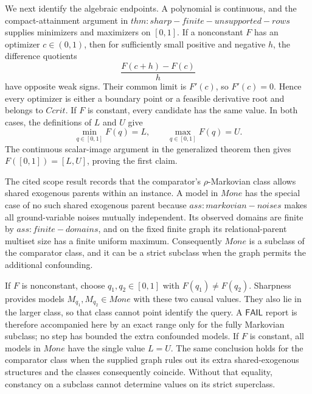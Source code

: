 We next identify the algebraic endpoints.  A polynomial is continuous, and the compact-attainment argument in \(thm:sharp-finite-unsupported-rows\) supplies minimizers and maximizers on \([0,1]\).  If a nonconstant \(F\) has an optimizer \(c\in(0,1)\), then for sufficiently small positive and negative \(h\), the difference quotients
\[
 \frac{F(c+h)-F(c)}{h}
\]
have opposite weak signs.  Their common limit is \(F'(c)\), so \(F'(c)=0\).  Hence every optimizer is either a boundary point or a feasible derivative root and belongs to \(Ccrit\).  If \(F\) is constant, every candidate has the same value.  In both cases, the definitions of \(L\) and \(U\) give
\[
 \min_{q\in[0,1]}F(q)=L,
 \qquad
 \max_{q\in[0,1]}F(q)=U.
\]
The continuous scalar-image argument in the generalized theorem then gives \(F([0,1])=[L,U]\), proving the first claim.

The cited scope result records that the comparator's \(\rho\)-Markovian class allows shared exogenous parents within an instance.  A model in \(Mone\) has the special case of no such shared exogenous parent because \(ass:markovian-noises\) makes all ground-variable noises mutually independent.  Its observed domains are finite by \(ass:finite-domains\), and on the fixed finite graph its relational-parent multiset size has a finite uniform maximum.  Consequently \(Mone\) is a subclass of the comparator class, and it can be a strict subclass when the graph permits the additional confounding.

If \(F\) is nonconstant, choose \(q_1,q_2\in[0,1]\) with \(F(q_1)\neq F(q_2)\).  Sharpness provides models \(M_{q_1},M_{q_2}\in Mone\) with these two causal values.  They also lie in the larger class, so that class cannot point identify the query.  A \(\mathsf{FAIL}\) report is therefore accompanied here by an exact range only for the fully Markovian subclass; no step has bounded the extra confounded models.  If \(F\) is constant, all models in \(Mone\) have the single value \(L=U\).  The same conclusion holds for the comparator class when the supplied graph rules out its extra shared-exogenous structures and the classes consequently coincide.  Without that equality, constancy on a subclass cannot determine values on its strict superclass.

